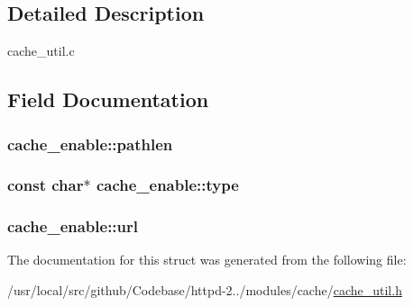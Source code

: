 \subsection{Detailed Description}
cache\+\_\+util.\+c 

\subsection{Field Documentation}
\subsubsection[{\texorpdfstring{pathlen}{pathlen}}]{ cache\+\_\+enable\+::pathlen}\hypertarget{structcache__enable_adce5084f188b489662db5aebcc678803}{}\label{structcache__enable_adce5084f188b489662db5aebcc678803}
\subsubsection[{\texorpdfstring{type}{type}}]{\setlength{\rightskip}{0pt plus 5cm}const char$\ast$ cache\+\_\+enable\+::type}\hypertarget{structcache__enable_ac513166fce03604d540df847fc3a4bbe}{}\label{structcache__enable_ac513166fce03604d540df847fc3a4bbe}
\subsubsection[{\texorpdfstring{url}{url}}]{ cache\+\_\+enable\+::url}\hypertarget{structcache__enable_a1c6a84f032b56cce4d6ba45fb4261454}{}\label{structcache__enable_a1c6a84f032b56cce4d6ba45fb4261454}


The documentation for this struct was generated from the following file\+:\begin{DoxyCompactItemize}
\item 
/usr/local/src/github/\+Codebase/httpd-\/2../modules/cache/\hyperlink{cache__util_8h}{cache\+\_\+util.\+h}\end{DoxyCompactItemize}
